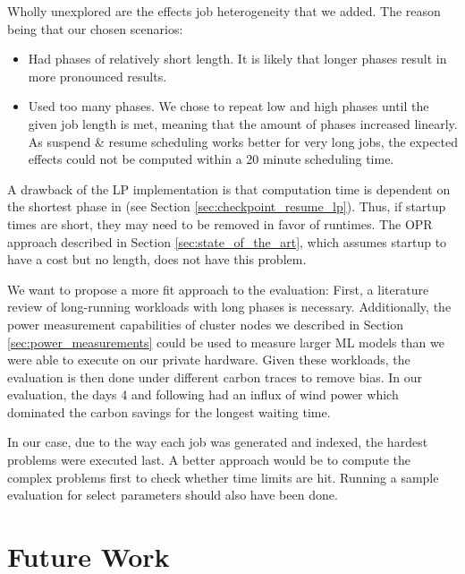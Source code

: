 Wholly unexplored are the effects job heterogeneity that we added.
The reason being that our chosen scenarios:

\begin{itemize}
    \item Had phases of relatively short length. It is likely that longer phases result in more pronounced results.
    \item Used too many phases. We chose to repeat low and high phases until the given job length is met, meaning that the amount of phases increased linearly. As suspend \& resume scheduling works better for very long jobs, the expected effects could not be computed within a 20 minute scheduling time.
\end{itemize}

A drawback of the LP implementation is that computation time is dependent on the shortest phase in \modelname{} (see Section \ref{sec:checkpoint_resume_lp}). Thus, if startup times are short, they may need to be removed in favor of runtimes. The OPR approach described in Section \ref{sec:state_of_the_art}, which assumes startup to have a cost but no length, does not have this problem.

We want to propose a more fit approach to the evaluation:
First, a literature review of long-running workloads with long phases is necessary. Additionally, the power measurement capabilities of cluster nodes we described in Section \ref{sec:power_measurements} could be used to measure larger ML models than we were able to execute on our private hardware.
Given these workloads, the evaluation is then done under different carbon traces to remove bias.
In our evaluation, the days 4 and following had an influx of wind power which dominated the carbon savings for the longest waiting time. 

In our case, due to the way each job was generated and indexed, the hardest problems were executed last. 
A better approach would be to compute the complex problems first to check whether time limits are hit.
Running a sample evaluation for select parameters should also have been done.

\section{Future Work} \label{sec:future_work}


